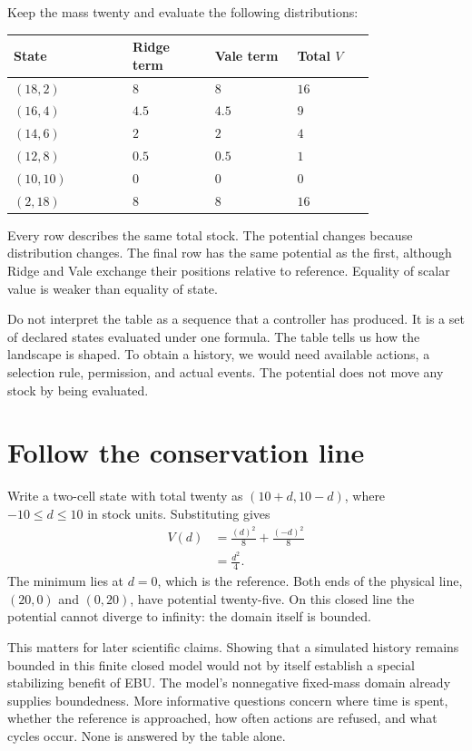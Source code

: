 Keep the mass twenty and evaluate the following distributions:
\begin{center}
\begin{tabular}{P{0.26\linewidth}P{0.18\linewidth}P{0.18\linewidth}P{0.17\linewidth}}
\toprule
State & Ridge term & Vale term & Total \(V\)\\
\midrule
\((18,2)\) & \(8\) & \(8\) & \(16\)\\
\((16,4)\) & \(4.5\) & \(4.5\) & \(9\)\\
\((14,6)\) & \(2\) & \(2\) & \(4\)\\
\((12,8)\) & \(0.5\) & \(0.5\) & \(1\)\\
\((10,10)\) & \(0\) & \(0\) & \(0\)\\
\((2,18)\) & \(8\) & \(8\) & \(16\)\\
\bottomrule
\end{tabular}
\end{center}
Every row describes the same total stock. The potential changes because distribution changes. The final row has the same potential as the first, although Ridge and Vale exchange their positions relative to reference. Equality of scalar value is weaker than equality of state.

Do not interpret the table as a sequence that a controller has produced. It is a set of declared states evaluated under one formula. The table tells us how the landscape is shaped. To obtain a history, we would need available actions, a selection rule, permission, and actual events. The potential does not move any stock by being evaluated.

\section{Follow the conservation line}

Write a two-cell state with total twenty as \((10+d,10-d)\), where \(-10\le d\le10\) in stock units. Substituting gives
\begin{align}
V(d)&=\frac{(d)^2}{8}+\frac{(-d)^2}{8}\\
&=\frac{d^2}{4}.
\end{align}
The minimum lies at \(d=0\), which is the reference. Both ends of the physical line, \((20,0)\) and \((0,20)\), have potential twenty-five. On this closed line the potential cannot diverge to infinity: the domain itself is bounded.

This matters for later scientific claims. Showing that a simulated history remains bounded in this finite closed model would not by itself establish a special stabilizing benefit of EBU. The model's nonnegative fixed-mass domain already supplies boundedness. More informative questions concern where time is spent, whether the reference is approached, how often actions are refused, and what cycles occur. None is answered by the table alone.

